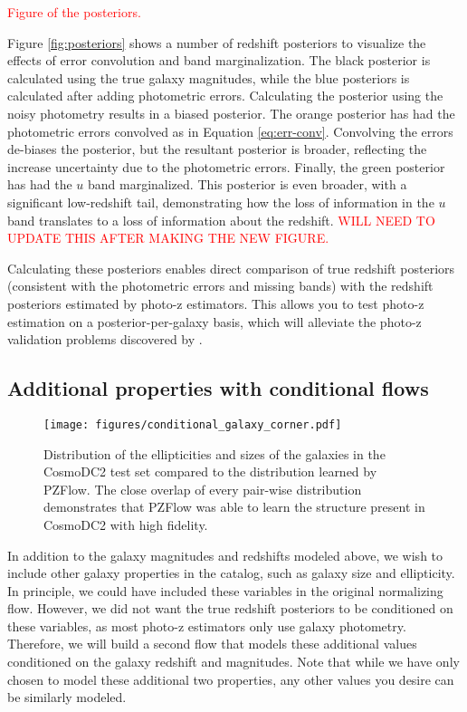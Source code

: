 \documentclass[twocolumn]{aastex631}
\newcommand{\note}[1]{\textsf{\textcolor{red}{#1}}}
\begin{document}
\note{Figure of the posteriors.}

Figure \ref{fig:posteriors} shows a number of redshift posteriors to visualize the effects of error convolution and band marginalization.
The black posterior is calculated using the true galaxy magnitudes, while the blue posteriors is calculated after adding photometric errors.
Calculating the posterior using the noisy photometry results in a biased posterior.
The orange posterior has had the photometric errors convolved as in Equation \ref{eq:err-conv}.
Convolving the errors de-biases the posterior, but the resultant posterior is broader, reflecting the increase uncertainty due to the photometric errors.
Finally, the green posterior has had the $u$ band marginalized.
This posterior is even broader, with a significant low-redshift tail, demonstrating how the loss of information in the $u$ band translates to a loss of information about the redshift.
\note{WILL NEED TO UPDATE THIS AFTER MAKING THE NEW FIGURE.}

Calculating these posteriors enables direct comparison of true redshift posteriors (consistent with the photometric errors and missing bands) with the redshift posteriors estimated by photo-z estimators.
This allows you to test photo-z estimation on a posterior-per-galaxy basis, which will alleviate the photo-z validation problems discovered by \citet{schmidt2020}.


\subsection{Additional properties with conditional flows}
\label{sec:fwd-model-condtional}

\begin{figure*}[t!]
    \begin{centering}
        \texttt{[image: figures/conditional\_galaxy\_corner.pdf]}
        \caption{
            Distribution of the ellipticities and sizes of the galaxies in the CosmoDC2 test set compared to the distribution learned by PZFlow.
            The close overlap of every pair-wise distribution demonstrates that PZFlow was able to learn the structure present in CosmoDC2 with high fidelity.
        }
        \label{fig:conditional-corner}
    \end{centering}
\end{figure*}

In addition to the galaxy magnitudes and redshifts modeled above, we wish to include other galaxy properties in the catalog, such as galaxy size and ellipticity.
In principle, we could have included these variables in the original normalizing flow.
However, we did not want the true redshift posteriors to be conditioned on these variables, as most photo-z estimators only use galaxy photometry.
Therefore, we will build a second flow that models these additional values conditioned on the galaxy redshift and magnitudes.
Note that while we have only chosen to model these additional two properties, any other values you desire can be similarly modeled.
\end{document}
